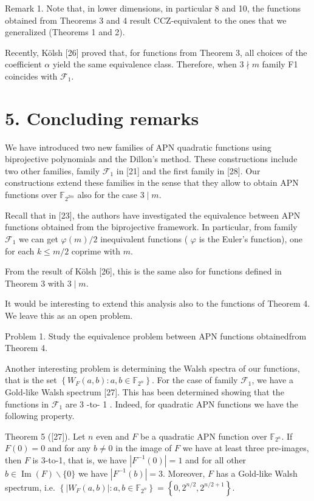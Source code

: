 \documentclass[10pt]{article}
\begin{document}
Remark 1. Note that, in lower dimensions, in particular 8 and 10, the functions obtained from Theorems 3 and 4 result CCZ-equivalent to the ones that we generalized (Theorems 1 and 2).

Recently, Kölsh [26] proved that, for functions from Theorem 3, all choices of the coefficient $\alpha$ yield the same equivalence class. Therefore, when $3 \nmid m$ family F1 coincides with $\mathcal{F}_{1}$.

\section*{5. Concluding remarks}
We have introduced two new families of APN quadratic functions using biprojective polynomials and the Dillon's method. These constructions include two other families, family $\mathcal{F}_{1}$ in [21] and the first family in [28]. Our constructions extend these families in the sense that they allow to obtain APN functions over $\mathbb{F}_{2^{2 m}}$ also for the case $3 \mid m$.

Recall that in [23], the authors have investigated the equivalence between APN functions obtained from the biprojective framework. In particular, from family $\mathcal{F}_{1}$ we can get $\varphi(m) / 2$ inequivalent functions ( $\varphi$ is the Euler's function), one for each $k \leq m / 2$ coprime with $m$.

From the result of Kölsh [26], this is the same also for functions defined in Theorem 3 with $3 \mid m$.

It would be interesting to extend this analysis also to the functions of Theorem 4. We leave this as an open problem.

Problem 1. Study the equivalence problem between APN functions obtainedfrom Theorem 4.

Another interesting problem is determining the Walsh spectra of our functions, that is the set $\left\{W_{F}(a, b): a, b \in \mathbb{F}_{2^{n}}\right\}$. For the case of family $\mathcal{F}_{1}$, we have a Gold-like Walsh spectrum [27]. This has been determined showing that the functions in $\mathcal{F}_{1}$ are 3 -to- 1 . Indeed, for quadratic APN functions we have the following property.

Theorem 5 ([27]). Let $n$ even and $F$ be a quadratic APN function over $\mathbb{F}_{2^{n}}$. If $F(0)=0$ and for any $b \neq 0$ in the image of $F$ we have at least three pre-images, then $F$ is 3-to-1, that is, we have $\left|F^{-1}(0)\right|=1$ and for all other $b \in \operatorname{Im}(F) \backslash\{0\}$ we have $\left|F^{-1}(b)\right|=3$. Moreover, $F$ has a Gold-like Walsh spectrum, i.e. $\left\{\left|W_{F}(a, b)\right|: a, b \in\right. \left.\mathbb{F}_{2^{n}}\right\}=\left\{0,2^{n / 2}, 2^{n / 2+1}\right\}$.
\end{document}
